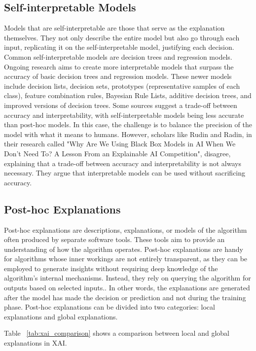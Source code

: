 \documentclass[10pt,journal,compsoc]{IEEEtran}
\begin{document}
\subsection{Self-interpretable Models}
Models that are self-interpretable are those that serve as the explanation themselves. They not only describe the entire model but also go through each input, replicating it on the self-interpretable model, justifying each decision.
Common self-interpretable models are decision trees and regression models. Ongoing research aims to create more interpretable models that surpass the accuracy of basic decision trees and regression models. These newer models include decision lists, decision sets, prototypes (representative samples of each class), feature combination rules, Bayesian Rule Lists, additive decision trees, and improved versions of decision trees.\cite{phillips2020four}
Some sources suggest a trade-off between accuracy and interpretability, with self-interpretable models being less accurate than post-hoc models. In this case, the challenge is to balance the precision of the model with what it means to humans. However, scholars like Rudin\cite{rudin} and Radin\cite{radin}, in their research called "Why Are We Using Black Box Models in AI When We Don’t Need To? A Lesson From an Explainable AI Competition", disagree, 
explaining that a trade-off between accuracy and interpretability is not always necessary. They argue that interpretable models can be used without sacrificing accuracy. \cite{phillips2020four}

\subsection{Post-hoc Explanations}
Post-hoc explanations are descriptions, explanations, or models of the algorithm often produced by separate software tools. These tools aim to provide an understanding of how the algorithm operates. Post-hoc explanations are handy for algorithms whose inner workings are not entirely transparent, as they can be employed to generate insights without requiring deep knowledge of the algorithm's internal mechanisms. Instead, they rely on querying the algorithm for outputs based on selected inputs.\cite{phillips2020four}.
In other words, the explanations are generated after the model has made the decision or prediction and not during the training phase. 
Post-hoc explanations can be divided into two categories: local explanations and global explanations. 

Table ~\ref{tab:xai_comparison} shows a comparison between local and global explanations in XAI.
 
\end{document}
